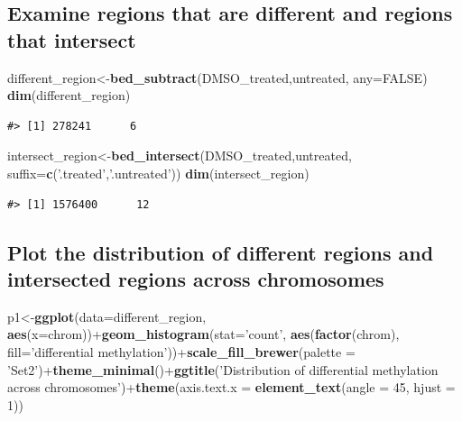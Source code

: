 \documentclass[9pt,a4paper]{extarticle}
\renewcommand{\KeywordTok}[1]{\textbf{{#1}}}
\renewcommand{\DataTypeTok}[1]{\textcolor[rgb]{0.50,0.00,0.00}{{#1}}}
\renewcommand{\DecValTok}[1]{\textcolor[rgb]{0.00,0.00,1.00}{{#1}}}
\renewcommand{\StringTok}[1]{\textcolor[rgb]{0.87,0.00,0.00}{{#1}}}
\renewcommand{\OtherTok}[1]{{#1}}
\renewcommand{\NormalTok}[1]{{#1}}
\begin{document}
\subsection{Examine regions that are different and regions that
intersect}\label{examine-regions-that-are-different-and-regions-that-intersect}

\begin{Shaded}
\begin{Highlighting}[]
\NormalTok{different_region<-}\KeywordTok{bed_subtract}\NormalTok{(DMSO_treated,untreated, }\DataTypeTok{any=}\OtherTok{FALSE}\NormalTok{)}
\KeywordTok{dim}\NormalTok{(different_region)}
\end{Highlighting}
\end{Shaded}

\begin{verbatim}
#> [1] 278241      6
\end{verbatim}

\begin{Shaded}
\begin{Highlighting}[]
\NormalTok{intersect_region<-}\KeywordTok{bed_intersect}\NormalTok{(DMSO_treated,untreated, }\DataTypeTok{suffix=}\KeywordTok{c}\NormalTok{(}\StringTok{'.treated'}\NormalTok{,}\StringTok{'.untreated'}\NormalTok{))}
\KeywordTok{dim}\NormalTok{(intersect_region)}
\end{Highlighting}
\end{Shaded}

\begin{verbatim}
#> [1] 1576400      12
\end{verbatim}

\subsection{Plot the distribution of different regions and intersected
regions across
chromosomes}\label{plot-the-distribution-of-different-regions-and-intersected-regions-across-chromosomes}

\begin{Shaded}
\begin{Highlighting}[]
\NormalTok{p1<-}\KeywordTok{ggplot}\NormalTok{(}\DataTypeTok{data=}\NormalTok{different_region, }\KeywordTok{aes}\NormalTok{(}\DataTypeTok{x=}\NormalTok{chrom))+}\KeywordTok{geom_histogram}\NormalTok{(}\DataTypeTok{stat=}\StringTok{'count'}\NormalTok{, }\KeywordTok{aes}\NormalTok{(}\KeywordTok{factor}\NormalTok{(chrom), }\DataTypeTok{fill=}\StringTok{'differential methylation'}\NormalTok{))+}\KeywordTok{scale_fill_brewer}\NormalTok{(}\DataTypeTok{palette =} \StringTok{'Set2'}\NormalTok{)+}\KeywordTok{theme_minimal}\NormalTok{()+}\KeywordTok{ggtitle}\NormalTok{(}\StringTok{'Distribution of differential methylation across chromosomes'}\NormalTok{)+}\KeywordTok{theme}\NormalTok{(}\DataTypeTok{axis.text.x =} \KeywordTok{element_text}\NormalTok{(}\DataTypeTok{angle =} \DecValTok{45}\NormalTok{, }\DataTypeTok{hjust =} \DecValTok{1}\NormalTok{))}
\end{Highlighting}
\end{Shaded}
\end{document}
